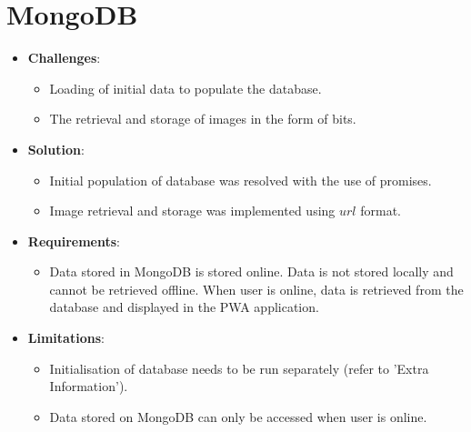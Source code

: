 \documentclass[11pt, a4paper]{article}
\begin{document}
\section{MongoDB}
\begin{itemize}
  \item \textbf{Challenges}:
  \begin{itemize}
    \item Loading of initial data to populate the database.
    \item The retrieval and storage of images in the form of bits.
  \end{itemize}
  \item \textbf{Solution}:
  \begin{itemize}
    \item Initial population of database was resolved with the use of promises.
    \item Image retrieval and storage was implemented using $url$ format.
  \end{itemize}
  \item \textbf{Requirements}:
  \begin{itemize}
    \item Data stored in MongoDB is stored online. Data is not stored locally and cannot be
    retrieved offline. When user is online, data is retrieved from the database and displayed in 
    the PWA application.
  \end{itemize}
  \item \textbf{Limitations}:
  \begin{itemize}
    \item Initialisation of database needs to be run separately (refer to 'Extra Information').
    \item Data stored on MongoDB can only be accessed when user is online.
  \end{itemize}
\end{itemize}
\end{document}
